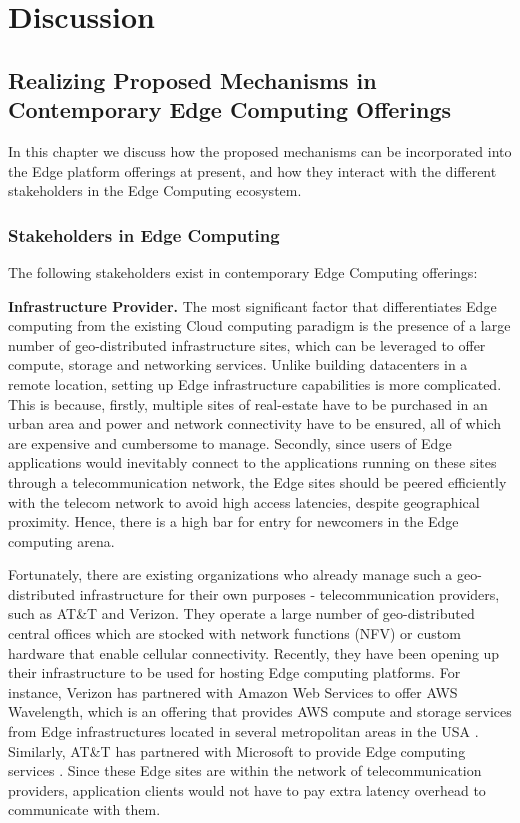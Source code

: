 \chapter{Discussion}
\label{sec:discussion}

\section{Realizing Proposed Mechanisms in Contemporary Edge Computing Offerings}
In this chapter we discuss how the proposed mechanisms can be incorporated into the Edge platform offerings at present, and how they interact with the different stakeholders in the Edge Computing ecosystem.
\subsection{Stakeholders in Edge Computing}
The following stakeholders exist in contemporary Edge Computing offerings:
\par \noindent \textbf{Infrastructure Provider.} The most significant factor that differentiates Edge computing from the existing Cloud computing paradigm is the presence of a large number of geo-distributed infrastructure sites, which can be leveraged to offer compute, storage and networking services. Unlike building datacenters in a remote location, setting up Edge infrastructure capabilities is more complicated. This is because, firstly, multiple sites of real-estate have to be purchased in an urban area and power and network connectivity have to be ensured, all of which are expensive and cumbersome to manage. Secondly, since users of Edge applications would inevitably connect to the applications running on these sites through a telecommunication network, the Edge sites should be peered efficiently with the telecom network to avoid high access latencies, despite geographical proximity. Hence, there is a high bar for entry for newcomers in the Edge computing arena.
\par Fortunately, there are existing organizations who already manage such a geo-distributed infrastructure for their own purposes - telecommunication providers, such as AT\&T and Verizon. They operate a large number of geo-distributed central offices which are stocked with network functions (NFV) or custom hardware that enable cellular connectivity. Recently, they have been opening up their infrastructure to be used for hosting Edge computing platforms. For instance, Verizon has partnered with Amazon Web Services to offer AWS Wavelength, which is an offering that provides AWS compute and storage services from Edge infrastructures located in several metropolitan areas in the USA \cite{aws_wavelength}. Similarly, AT\&T has partnered with Microsoft to provide Edge computing services \cite{att_microsoft}. Since these Edge sites are within the network of telecommunication providers, application clients would not have to pay extra latency overhead to communicate with them. 
